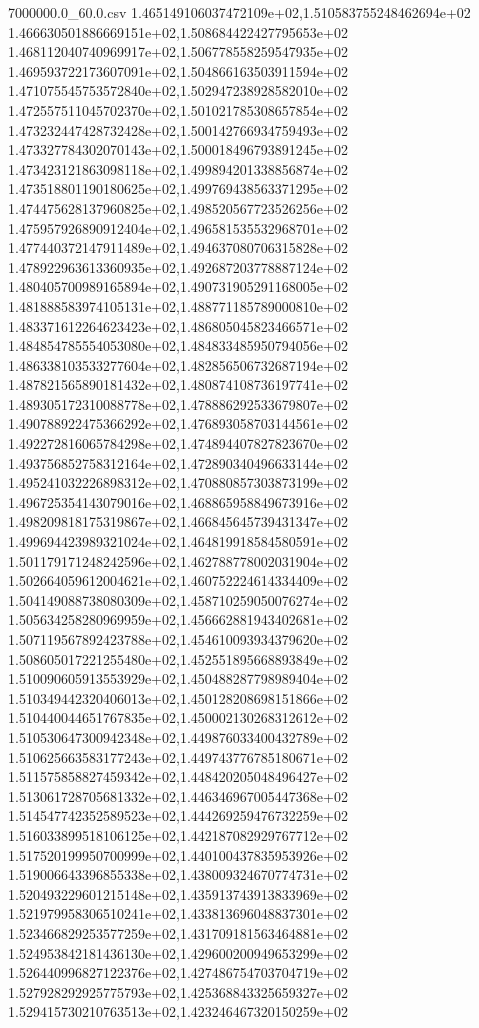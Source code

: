 \begin{filecontents*}{7000000.0_60.0.csv}
1.465149106037472109e+02,1.510583755248462694e+02
1.466630501886669151e+02,1.508684422427795653e+02
1.468112040740969917e+02,1.506778558259547935e+02
1.469593722173607091e+02,1.504866163503911594e+02
1.471075545753572840e+02,1.502947238928582010e+02
1.472557511045702370e+02,1.501021785308657854e+02
1.473232447428732428e+02,1.500142766934759493e+02
1.473327784302070143e+02,1.500018496793891245e+02
1.473423121863098118e+02,1.499894201338856874e+02
1.473518801190180625e+02,1.499769438563371295e+02
1.474475628137960825e+02,1.498520567723526256e+02
1.475957926890912404e+02,1.496581535532968701e+02
1.477440372147911489e+02,1.494637080706315828e+02
1.478922963613360935e+02,1.492687203778887124e+02
1.480405700989165894e+02,1.490731905291168005e+02
1.481888583974105131e+02,1.488771185789000810e+02
1.483371612264623423e+02,1.486805045823466571e+02
1.484854785554053080e+02,1.484833485950794056e+02
1.486338103533277604e+02,1.482856506732687194e+02
1.487821565890181432e+02,1.480874108736197741e+02
1.489305172310088778e+02,1.478886292533679807e+02
1.490788922475366292e+02,1.476893058703144561e+02
1.492272816065784298e+02,1.474894407827823670e+02
1.493756852758312164e+02,1.472890340496633144e+02
1.495241032226898312e+02,1.470880857303873199e+02
1.496725354143079016e+02,1.468865958849673916e+02
1.498209818175319867e+02,1.466845645739431347e+02
1.499694423989321024e+02,1.464819918584580591e+02
1.501179171248242596e+02,1.462788778002031904e+02
1.502664059612004621e+02,1.460752224614334409e+02
1.504149088738080309e+02,1.458710259050076274e+02
1.505634258280969959e+02,1.456662881943402681e+02
1.507119567892423788e+02,1.454610093934379620e+02
1.508605017221255480e+02,1.452551895668893849e+02
1.510090605913553929e+02,1.450488287798989404e+02
1.510349442320406013e+02,1.450128208698151866e+02
1.510440044651767835e+02,1.450002130268312612e+02
1.510530647300942348e+02,1.449876033400432789e+02
1.510625663583177243e+02,1.449743776785180671e+02
1.511575858827459342e+02,1.448420205048496427e+02
1.513061728705681332e+02,1.446346967005447368e+02
1.514547742352589523e+02,1.444269259476732259e+02
1.516033899518106125e+02,1.442187082929767712e+02
1.517520199950700999e+02,1.440100437835953926e+02
1.519006643396855338e+02,1.438009324670774731e+02
1.520493229601215148e+02,1.435913743913833969e+02
1.521979958306510241e+02,1.433813696048837301e+02
1.523466829253577259e+02,1.431709181563464881e+02
1.524953842181436130e+02,1.429600200949653299e+02
1.526440996827122376e+02,1.427486754703704719e+02
1.527928292925775793e+02,1.425368843325659327e+02
1.529415730210763513e+02,1.423246467320150259e+02

\end{filecontents*}

